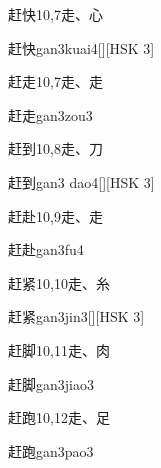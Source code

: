 \begin{Entry}{赶快}{10,7}{⾛、⼼}
  \begin{Phonetics}{赶快}{gan3kuai4}[][HSK 3]
  \end{Phonetics}
\end{Entry}

\begin{Entry}{赶走}{10,7}{⾛、⾛}
  \begin{Phonetics}{赶走}{gan3zou3}
  \end{Phonetics}
\end{Entry}

\begin{Entry}{赶到}{10,8}{⾛、⼑}
  \begin{Phonetics}{赶到}{gan3 dao4}[][HSK 3]
  \end{Phonetics}
\end{Entry}

\begin{Entry}{赶赴}{10,9}{⾛、⾛}
  \begin{Phonetics}{赶赴}{gan3fu4}
  \end{Phonetics}
\end{Entry}

\begin{Entry}{赶紧}{10,10}{⾛、⽷}
  \begin{Phonetics}{赶紧}{gan3jin3}[][HSK 3]
  \end{Phonetics}
\end{Entry}

\begin{Entry}{赶脚}{10,11}{⾛、⾁}
  \begin{Phonetics}{赶脚}{gan3jiao3}
  \end{Phonetics}
\end{Entry}

\begin{Entry}{赶跑}{10,12}{⾛、⾜}
  \begin{Phonetics}{赶跑}{gan3pao3}
  \end{Phonetics}
\end{Entry}

